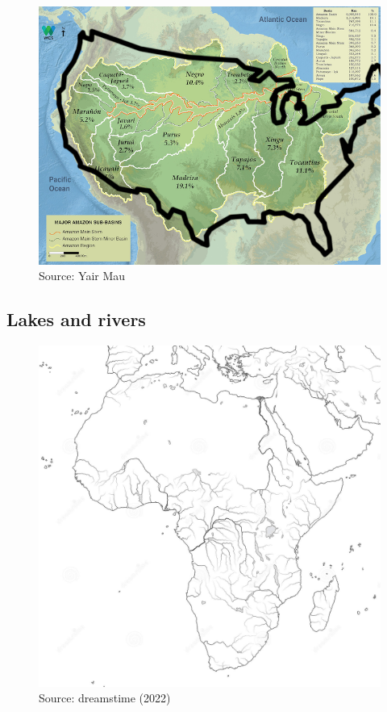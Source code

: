 \documentclass[
  letterpaper,
  DIV=11,
  numbers=noendperiod]{scrreprt}
\begin{document}
\begin{figure}

{\centering \includegraphics{archive/figures/amazon-basin-us.png}

}

\caption{Source: Yair Mau}

\end{figure}

\hypertarget{lakes-and-rivers}{%
\subsection{Lakes and rivers}\label{lakes-and-rivers}}

\begin{figure}

{\centering \includegraphics{archive/figures/rivers-africa.png}

}

\caption{Source: dreamstime (2022)}

\end{figure}
\end{document}

